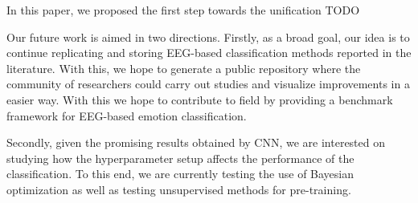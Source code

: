 \documentclass{sig-alternate}
\begin{document}
In this paper, we proposed the first step towards the unification  TODO


Our future work is aimed in two directions. Firstly, as a broad
goal, our idea is to continue replicating and  storing EEG-based 
classification methods reported in the literature. With this, we hope
to generate a public repository where the community of researchers
could carry out studies and visualize improvements in  a easier way. 
With this we hope to contribute to field by providing a benchmark
framework for EEG-based emotion classification.

Secondly, given the promising results obtained by CNN, we are
interested on studying how the hyperparameter setup affects the 
performance of the classification. To this end, we are currently testing
the use of Bayesian optimization as well as testing unsupervised methods
for pre-training.


%

%
%
\end{document}
